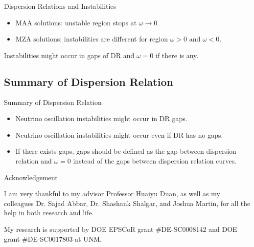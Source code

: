 \documentclass[9pt]{beamer}
\begin{document}
\begin{darkframes}
\begin{frame}{Dispersion Relations and Instabilities}
\pause
\begin{tcolorbox}
   \begin{itemize}
      \item
      \color{black}MAA solutions: unstable region stops at $\omega\to 0$
      \item
      \color{black} MZA solutions: instabilities are different for region $\omega>0$ and $\omega<0$.
   \end{itemize}
\end{tcolorbox}
\pause
\begin{tcolorbox}
   \color{black} Instabilities might occur in gaps of DR and $\omega=0$ if there is any.
\end{tcolorbox}

\end{frame}








\subsection{Summary of Dispersion Relation}

\begin{frame}{Summary of Dispersion Relation}

\begin{itemize}
   \item Neutrino oscillation instabilities might occur in DR gaps.
   \item Neutrino oscillation instabilities might occur even if DR has no gaps.
   \item If there exists gaps, gaps should be defined as the gap between dispersion relation and $\omega=0$ instead of the gaps between dispersion relation curves.
\end{itemize}

\end{frame}








\begin{frame}{Acknowledgement}

I am very thankful to my advisor Professor Huaiyu Duan, as well as my colleagues Dr. Sajad Abbar, Dr. Shashank Shalgar, and Joshua Martin, for all the help in both research and life.

My research is supported by DOE EPSCoR grant \#DE-SC0008142 and DOE grant \#DE-SC0017803 at UNM.


\end{frame}
\end{darkframes}
\end{document}
